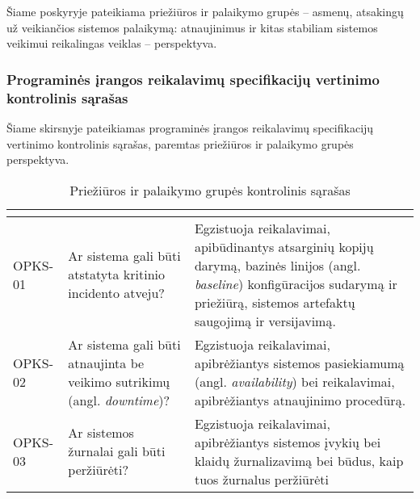 \documentclass{VUMIFPSkursinis}
\begin{document}
Šiame poskyryje pateikiama priežiūros ir palaikymo grupės -- asmenų, atsakingų už veikiančios
sistemos palaikymą: atnaujinimus ir kitas stabiliam sistemos veikimui reikalingas veiklas -- perspektyva.

\subsubsection{Programinės įrangos reikalavimų specifikacijų vertinimo kontrolinis sąrašas}

Šiame skirsnyje pateikiamas programinės įrangos reikalavimų specifikacijų vertinimo kontrolinis sąrašas,
paremtas priežiūros ir palaikymo grupės perspektyva.

\begin{center}
	\small
	\begin{longtable}{|C{2cm}|L{5cm}|L{8cm}|}
		\caption{Priežiūros ir palaikymo grupės kontrolinis sąrašas}
		\label{table:EmployeeSalary}
		\\ \hline
		                                                         &
		                                             &
		\\ \hline
		OPKS-01                                                                                                 &
		Ar sistema gali būti atstatyta kritinio incidento atveju?                                               &
		Egzistuoja reikalavimai, apibūdinantys atsarginių kopijų darymą, bazinės linijos (angl. \textit{baseline}) konfigūracijos sudarymą ir priežiūrą, sistemos artefaktų saugojimą ir versijavimą. \\ \hline
		OPKS-02                                                                                                 &
		Ar sistema gali būti atnaujinta be veikimo sutrikimų (angl. \textit{downtime})?                         &
		Egzistuoja reikalavimai, apibrėžiantys sistemos pasiekiamumą (angl. \textit{availability}) bei reikalavimai, apibrėžiantys atnaujinimo procedūrą.                                             \\ \hline
		OPKS-03                                                                                                 &
		Ar sistemos žurnalai gali būti peržiūrėti?                                                              &
		Egzistuoja reikalavimai, apibrėžiantys sistemos įvykių bei klaidų žurnalizavimą bei būdus, kaip tuos žurnalus peržiūrėti                                                                      \\ \hline

\end{longtable}
\end{center}
\end{document}
